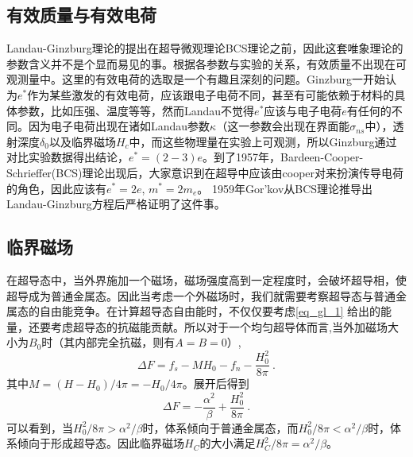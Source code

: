 \subsection{有效质量与有效电荷}
Landau-Ginzburg理论的提出在超导微观理论BCS理论之前，因此这套唯象理论的参数含义并不是个显而易见的事。根据各参数与实验的关系，有效质量不出现在可观测量中。这里的有效电荷的选取是一个有趣且深刻的问题。Ginzburg一开始认为$e^*$作为某些激发的有效电荷，应该跟电子电荷不同，甚至有可能依赖于材料的具体参数，比如压强、温度等等，然而Landau不觉得$e^*$应该与电子电荷$e$有任何的不同。因为电子电荷出现在诸如Landau参数$\kappa$（这一参数会出现在界面能$\sigma_{ns}$中），透射深度$\delta_0$以及临界磁场$H_c$中，而这些物理量在实验上可观测，所以Ginzburg通过对比实验数据得出结论，$e^* = (2-3)e$。到了1957年，Bardeen-Cooper-Schrieffer(BCS)理论出现后，大家意识到在超导中应该由cooper对来扮演传导电荷的角色，因此应该有$e^* = 2e$, $m^* = 2m_e$。 1959年Gor'kov从BCS理论推导出Landau-Ginzburg方程后严格证明了这件事。
\subsection{临界磁场}
在超导态中，当外界施加一个磁场，磁场强度高到一定程度时，会破坏超导相，使超导成为普通金属态。因此当考虑一个外磁场时，我们就需要考察超导态与普通金属态的自由能竞争。在计算超导态自由能时，不仅仅要考虑\autoref{eq_gl_1} 给出的能量，还要考虑超导态的抗磁能贡献。所以对于一个均匀超导体而言,当外加磁场大小为$B_0$时（其内部完全抗磁，则有$A=B=0$）,
\begin{equation}
\Delta F = f_s -M H_0 -f_n - \frac{H_0^2}{8\pi}~.
\end{equation}
其中$M = (H-H_0)/4\pi = -H_0/4\pi$。展开后得到
\begin{equation}
\Delta F = -\frac{\alpha^2}{\beta} + \frac{H_0^2}{8\pi}~.
\end{equation}
可以看到，当$H_0^2/8\pi > \alpha^2/\beta$时，体系倾向于普通金属态，而$H_0^2/8\pi<\alpha^2/\beta$时，体系倾向于形成超导态。因此临界磁场$H_C$的大小满足$H_C^2/8\pi = \alpha^2/\beta$。
